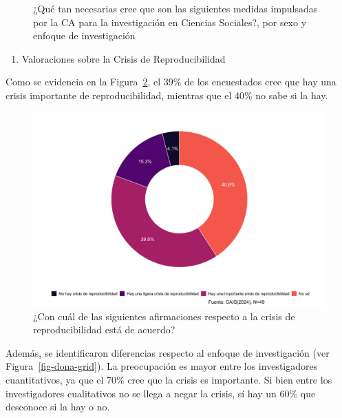 \documentclass[
  letterpaper,
  DIV=11,
  numbers=noendperiod]{scrreprt}
\providecommand{\tightlist}{%
  \setlength{\itemsep}{0pt}\setlength{\parskip}{0pt}}\usepackage{longtable,booktabs,array}
\begin{document}
\begin{figure}
\begin{minipage}[t]{\linewidth}
{{}

}

\end{minipage}%

\caption{\label{fig-vca-grid}¿Qué tan necesarias cree que son las
siguientes medidas impulsadas por la CA para la investigación en
Ciencias Sociales?, por sexo y enfoque de investigación}

\end{figure}

\begin{enumerate}
\def\labelenumi{\alph{enumi})}
\setcounter{enumi}{1}
\tightlist
\item
  Valoraciones sobre la Crisis de Reproducibilidad
\end{enumerate}

Como se evidencia en la Figura~\ref{fig-dona}, el 39\% de los
encuestados cree que hay una crisis importante de reproducibilidad,
mientras que el 40\% no sabe si la hay.

\begin{figure}

{\centering \includegraphics{paper_files/figure-pdf/fig-dona-1.png}

}

\caption{\label{fig-dona}¿Con cuál de las siguientes afirmaciones
respecto a la crisis de reproducibilidad está de acuerdo?}

\end{figure}

Además, se identificaron diferencias respecto al enfoque de
investigación (ver Figura~\ref{fig-dona-grid}). La preocupación es mayor
entre los investigadores cuantitativos, ya que el 70\% cree que la
crisis es importante. Si bien entre los investigadores cualitativos no
se llega a negar la crisis, sí hay un 60\% que desconoce si la hay o no.
\end{document}
